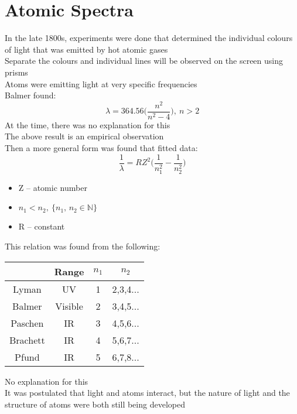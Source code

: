 \documentclass[a4paper, 11pt, fleqn, normalem]{report}
\begin{document}
\section{Atomic Spectra}
In the late 1800s, experiments were done that determined the individual colours of light that was emitted by hot atomic gases \\
Separate the colours and individual lines will be observed on the screen using prisms \\
Atoms were emitting light at very specific frequencies \\
Balmer found:
\begin{equation*}
    \lambda = 364.56\Big(\frac{n^{2}}{n^{2} - 4}\Big),~n > 2
\end{equation*}
At the time, there was no explanation for this \\
The above result is an empirical observation \\
Then a more general form was found that fitted data:
\begin{equation*}
    \frac{1}{\lambda} = RZ^{2}\Big(\frac{1}{n_{1}^{2}} - \frac{1}{n_{2}^{2}}\Big)
\end{equation*}
\begin{itemize}
    \item Z -- atomic number
    \item $n_{1} < n_{2},~\{n_{1},\,n_{2} \in \mathbb{N}\}$
    \item R -- constant
\end{itemize}
This relation was found from the following:
\begin{table}[H]
    \begin{tabular}{c|ccc}
                 & Range   & $n_{1}$ & $n_{2}$  \\
        \hline
        Lyman    & UV      & 1       & 2,3,4... \\
        Balmer   & Visible & 2       & 3,4,5... \\
        Paschen  & IR      & 3       & 4,5,6... \\
        Brachett & IR      & 4       & 5,6,7... \\
        Pfund    & IR      & 5       & 6,7,8...
    \end{tabular}
\end{table}
No explanation for this \\
It was postulated that light and atoms interact, but the nature of light and the structure of atoms were both still being developed
\end{document}
